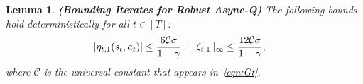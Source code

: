 \documentclass{article}
\newcommand{\mc}{\mathcal}
\newtheorem{lemma}{Lemma}
\begin{document}
\begin{lemma}\label{lemma:Lemma_2_bounds for AH_Blackbox Case}\textbf{(Bounding Iterates for Robust Async-Q)}
  The following bounds hold deterministically for all \(t \in [T]\):
\begin{align}
    \lvert\eta_{t,1}(s_t, a_t)\rvert &\le \frac{6 \mc{C}\tilde{\sigma}}{1-\gamma}, \hspace{2 mm} \Vert \zeta_{t,1} \Vert_{\infty} \le \frac{12 \mc{C}\tilde{\sigma}}{1-\gamma},
\end{align}
where $\mc{C}$ is the universal constant that appears in~\eqref{eqn:Gt}. 
\end{lemma}
\end{document}
